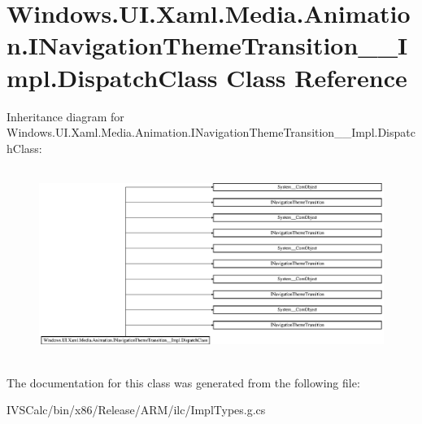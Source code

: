 \hypertarget{class_windows_1_1_u_i_1_1_xaml_1_1_media_1_1_animation_1_1_i_navigation_theme_transition_____impl_1_1_dispatch_class}{}\section{Windows.\+U\+I.\+Xaml.\+Media.\+Animation.\+I\+Navigation\+Theme\+Transition\+\_\+\+\_\+\+Impl.\+Dispatch\+Class Class Reference}
\label{class_windows_1_1_u_i_1_1_xaml_1_1_media_1_1_animation_1_1_i_navigation_theme_transition_____impl_1_1_dispatch_class}
Inheritance diagram for Windows.\+U\+I.\+Xaml.\+Media.\+Animation.\+I\+Navigation\+Theme\+Transition\+\_\+\+\_\+\+Impl.\+Dispatch\+Class\+:\begin{figure}[H]
\begin{center}
\leavevmode
\includegraphics[height=6.234818cm]{class_windows_1_1_u_i_1_1_xaml_1_1_media_1_1_animation_1_1_i_navigation_theme_transition_____impl_1_1_dispatch_class}
\end{center}
\end{figure}


The documentation for this class was generated from the following file\+:\begin{DoxyCompactItemize}
\item 
I\+V\+S\+Calc/bin/x86/\+Release/\+A\+R\+M/ilc/Impl\+Types.\+g.\+cs\end{DoxyCompactItemize}
